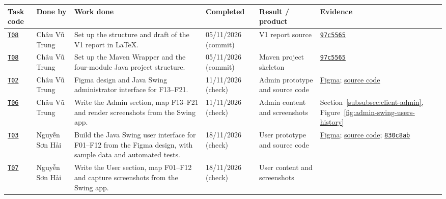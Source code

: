 \begin{center}
\small
\setlength{\tabcolsep}{4pt}
\label{tab:task-results}
\begin{tabularx}{\textwidth}{|C{1.4cm}|L{2.2cm}|Y|L{2.1cm}|L{2.5cm}|L{2cm}|}
  \hline
  \textbf{Task code} & \textbf{Done by} & \textbf{Work done} &
  \textbf{Completed} & \textbf{Result / product} & \textbf{Evidence}\\
  \hline
  \hyperlink{T08}{\texttt{T08}} & Châu Vũ Trung &
    Set up the structure and draft of the V1 report in LaTeX. &
    05/11/2026 (commit) & V1 report source &
    \href{https://github.com/nguyenshai/Project-java/commit/97c5565ffd339990c2cdc7d8f282d2d1a080a7d6}{\texttt{97c5565}} \\
  \hline
  \hyperlink{T08}{\texttt{T08}} & Châu Vũ Trung &
    Set up the Maven Wrapper and the four-module Java project structure. &
    05/11/2026 (commit) & Maven project skeleton &
    \href{https://github.com/nguyenshai/Project-java/commit/97c5565ffd339990c2cdc7d8f282d2d1a080a7d6}{\texttt{97c5565}} \\
  \hline
  \hyperlink{T02}{\texttt{T02}} & Châu Vũ Trung &
    Figma design and Java Swing administrator interface for F13--F21. &
    11/11/2026 (check) & Admin prototype and source code &
    \href{https://www.figma.com/design/maCogjZs9eOOhfkxsOZoIU/ChatApp-Admin?node-id=2-80}{Figma};
    \href{https://github.com/nguyenshai/Project-java/tree/main/src/admin-client}{source code} \\
  \hline
  \hyperlink{T06}{\texttt{T06}} & Châu Vũ Trung &
    Write the Admin section, map F13--F21 and render screenshots from the Swing app. &
    11/11/2026 (check) & Admin content and screenshots &
    Section~\ref{subsubsec:client-admin}, Figure~\ref{fig:admin-swing-users-history} \\
  \hline
  \hyperlink{T03}{\texttt{T03}} & Nguyễn Sơn Hải &
    Build the Java Swing user interface for F01--F12 from the Figma design,
    with sample data and automated tests. &
    18/11/2026 (check) & User prototype and source code &
    \href{https://www.figma.com/design/maCogjZs9eOOhfkxsOZoIU?node-id=129-930}{Figma};
    \href{https://github.com/nguyenshai/Project-java/tree/main/src/user-client}{source code};
    \href{https://github.com/nguyenshai/Project-java/commit/830c8ab}{\texttt{830c8ab}} \\
  \hline
  \hyperlink{T07}{\texttt{T07}} & Nguyễn Sơn Hải &
    Write the User section, map F01--F12 and capture screenshots from the Swing app. &
    18/11/2026 (check) & User content and screenshots &

\end{tabularx}
\end{center}
